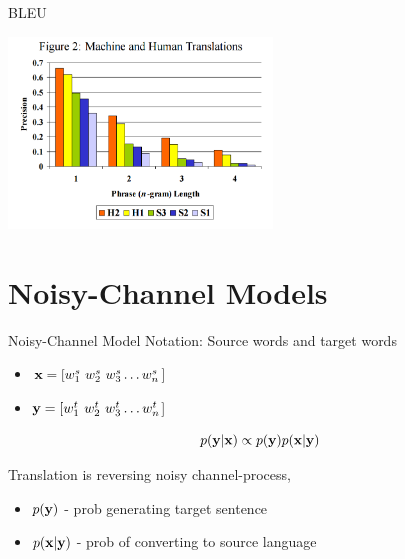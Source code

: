 \documentclass{beamer}
\begin{document}
\begin{frame}{BLEU}
  \begin{center}
    \includegraphics[width=7cm]{bleulen}
  \end{center}
\end{frame}

  


\section{Noisy-Channel Models}

\begin{frame}{Noisy-Channel Model}
  Notation: Source words and target words
  \begin{itemize}
  \item $\mathbf{x}  = [ w^s_1\ w^s_2\ w^s_3\ldots w^s_n $] 
  \item $\mathbf{y} =  [w^t_1\ w^t_2\ w^t_3\ldots w^t_n $] 
  \end{itemize}

  \[ p(\mathbf{y} | \mathbf{x}) \propto p(\mathbf{y}) p(\mathbf{x} | \mathbf{y}) \] 


  Translation is reversing noisy channel-process,
  \begin{itemize}
  \item $p(\mathbf{y})$ - prob generating target sentence
  \item $p(\mathbf{x} | \mathbf{y})$ - prob of converting to source language
  \end{itemize}
\end{frame}
\end{document}
